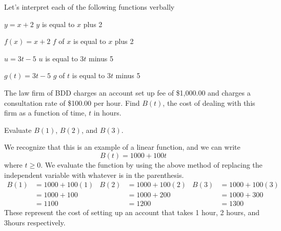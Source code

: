 \begin{myexample}
Let's interpret each of the following functions verbally
\begin{description}
	\item $y=x+2$      $y$ is equal to $x$ plus 2          	
	\item $f(x)=x+2$   $f$ of $x$ is equal to $x$ plus 2   
	\item $u=3t-5$     $u$ is equal to $3t$ minus 5        
	\item $g(t)=3t-5$  $g$ of $t$ is equal to $3t$ minus 5 
\end{description}
\end{myexample}

\begin{myexample}
The law firm of BDD charges an account set up fee of \$1,000.00 and charges a consultation
rate of \$100.00 per hour. Find $B(t)$, the cost of dealing with this firm as a function of time, $t$
in hours. 

Evaluate $B(1)$, $B(2)$, and $B(3)$.
\end{myexample}
\begin{myProof}
	We recognize that this is an example of a linear function, and we can write
	\[
		B(t)=1000+100t
	\]
	where $t\geq 0$. We evaluate the function by using the above method of replacing the independent
	variable with whatever is in the parenthesis.
	\begin{align*}
		B(1) & =	 1000+100(1) & B(2) & =	 1000+100(2) & B(3) & =	 1000+100(3) \\
		     & =	 1000+100    &      & =	 1000+200    &      & =	 1000+300    \\
		     & =	 1100        &      & =	 1200        &      & =	 1300        
	\end{align*} 
	These represent the cost of setting up an account that takes 1 hour, 2 hours, and 3hours
	respectively.
\end{myProof} 


